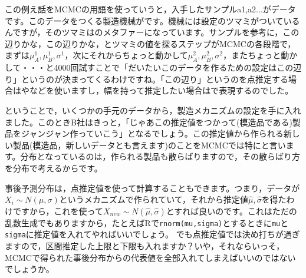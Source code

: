 \documentclass{ltjsbook}
\begin{document}
この例え話をMCMCの用語を使っていうと，入手したサンプルa1,a2...がデータです。このデータをつくる製造機械がです。機械には設定のツマミがついているんですが，そのツマミはのメタファーになっています。サンプルを参考に，この辺りかな，この辺りかな，とツマミの値を探るステップがMCMCの各段階で，まずは$\mu_A^1,\mu_B^1,\sigma^1$，次にそれからちょっと動かして$\mu_A^2,\mu_B^2,\sigma^2$，またちょっと動かして・・・と4000回試すことで「だいたいこのデータを作るための設定はこの辺り」というのが決まってくるわけですね。「この辺り」というのを点推定する場合はやなどを使いますし，幅を持って推定したい場合はで表現するのでした。

ということで，いくつかの手元のデータから，製造メカニズムの設定を手に入れました。このときB社はきっと，「じゃあこの推定値をつかって(模造品である)製品をジャンジャン作っていこう」となるでしょう。この推定値から作られる新しい製品(模造品，新しいデータとも言えます)のことをMCMCでは特にと言います。分布となっているのは，作られる製品も散らばりますので，その散らばり方を分布で考えるからです。

事後予測分布は，点推定値を使って計算することもできます。つまり，データが$X_{i}\sim N(\mu,\sigma)$というメカニズムで作られていて，それから推定値$\hat{\mu},\hat{\sigma}$を得たわけですから，これを使って$X_{new}\sim N(\hat{\mu},\hat{\sigma})$とすれば良いのです。これはただの乱数生成でもありますから，たとえばRで\verb|rnorm(mu,sigma)|とするときに\verb|mu|と\verb|sigma|に推定値を入れてやればいいでしょう。
でも点推定値では決め打ちが過ぎますので，区間推定した上限と下限も入れますか？いや，それならいっそ，MCMCで得られた事後分布からの代表値を全部入れてしまえばいいのではないでしょうか。
\end{document}
